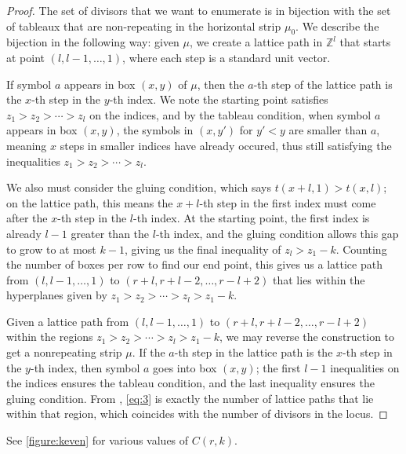 \documentclass[11pt,reqno]{amsart}
\newcommand*{\Z}{\mathbb{Z}}
\theoremstyle{definition}
\theoremstyle{problem}
\theoremstyle{plain}
\theoremstyle{remark}
\theoremstyle{theorem}
\numberwithin{equation}{section}
\numberwithin{figure}{section}
\begin{document}
\begin{proof}
  The set of divisors that we want to enumerate is in bijection with the set of tableaux that are non-repeating in the horizontal strip $\mu_0$. We describe the bijection in the following way: given $\mu$, we create a lattice path in $\Z^l$ that starts at point $(l,l-1,\ldots,1)$, where each step is a standard unit vector. 

  If symbol $a$ appears in box $(x,y)$ of $\mu$, then the $a$-th step of the lattice path is the $x$-th step in the $y$-th index. We note the starting point satisfies $z_1>z_2>\cdots>z_l$ on the indices, and by the tableau condition, when symbol $a$ appears in box $(x,y)$, the symbols in $(x,y')$ for $y'<y$ are smaller than $a$, meaning $x$ steps in smaller indices have already occured, thus still satisfying the inequalities $z_1>z_2>\cdots>z_l$.

  We also must consider the gluing condition, which says $t(x+l,1)>t(x,l)$; on the lattice path, this means the $x+l$-th step in the first index must come after the $x$-th step in the $l$-th index. At the starting point, the first index is already $l-1$ greater than the $l$-th index, and the gluing condition allows this gap to grow to at most $k-1$, giving us the final inequality of $z_l>z_1-k$. Counting the number of boxes per row to find our end point, this gives us a lattice path from $(l,l-1,\ldots,1)$ to $(r+l,r+l-2,\ldots,r-l+2)$ that lies within the hyperplanes given by $z_1>z_2>\cdots>z_l>z_1-k$.

  Given a lattice path from $(l,l-1,\ldots,1)$ to $(r+l,r+l-2,\ldots,r-l+2)$ within the regions $z_1>z_2>\cdots>z_l>z_1-k$, we may reverse the construction to get a nonrepeating strip $\mu$. If the $a$-th step in the lattice path is the $x$-th step in the $y$-th index, then symbol $a$ goes into box $(x,y)$; the first $l-1$ inequalities on the indices ensures the tableau condition, and the last inequality ensures the gluing condition. From \cite[Theorem~10.18.6]{bona2015handbook}, \cref{eq:3} is exactly the number of lattice paths that lie within that region, which coincides with the number of divisors in the locus. 
\end{proof}

See \cref{figure:keven} for various values of $C(r,k)$.
\end{document}
